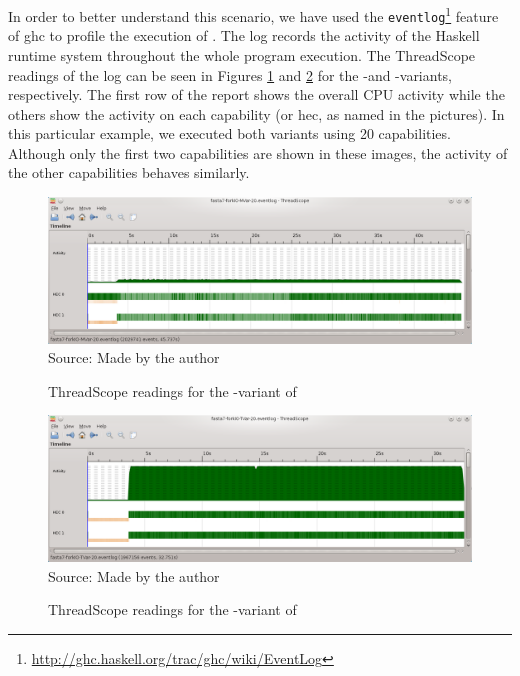 In order to better understand this scenario, we have used the \texttt{eventlog}\footnote{\url{http://ghc.haskell.org/trac/ghc/wiki/EventLog}} feature of \ac{ghc} to profile the execution of \fasta. The log records the activity of the Haskell runtime system throughout the whole program execution. The ThreadScope~\cite{jones:2009} readings of the log can be seen in Figures \ref{fig:threadscope1a} and \ref{fig:threadscope1b} for the \forkIO-\MVar and \forkIO-\TVar variants, respectively. The first row of the report shows the overall CPU activity while the others show the activity on each capability (or \ac{hec}, as named in the pictures). In this particular example, we executed both variants using 20 capabilities. Although only the first two capabilities are shown in these images, the activity of the other capabilities behaves similarly.

\begin{figure}[h]
\caption{ThreadScope readings for the \forkIO-\MVar variant of \fasta}
\centering
\includegraphics[width=\linewidth]{images/fasta-forkIO-MVar-20}
\footnotesize{Source: Made by the author}
\label{fig:threadscope1a}
\end{figure}

\begin{figure}[h]
\caption{ThreadScope readings for the \forkIO-\TVar variant of \fasta}
\centering
\includegraphics[width=\linewidth]{images/fasta-forkIO-TVar-20}
\footnotesize{Source: Made by the author}
\label{fig:threadscope1b}
\end{figure}

